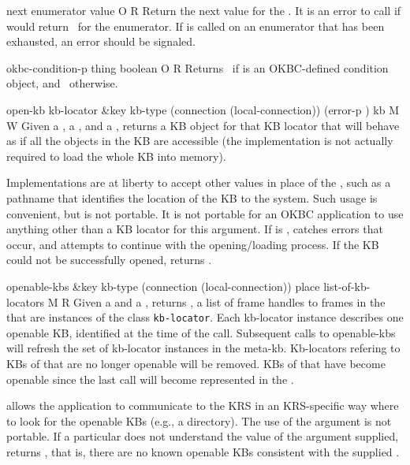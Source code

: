 \begin{okbcop}{next}{ enumerator} { value } { O } { R } {  }
Return the next value for the .  It is an error to
   call  if  would return \false\ for the
   enumerator.  If  is called on an enumerator that has been 
   exhausted, an  error should be signaled.
\end{okbcop}

\begin{okbcop}{okbc-condition-p}{ thing} { boolean } { O } { R } {  }
Returns \true\ if  is an OKBC-defined condition object, and
   \false\ otherwise.
\end{okbcop}

\begin{okbcop}{open-kb}{ kb-locator \&key kb-type (connection (local-connection)) (error-p \true)} { kb } { M } { W } {  }
Given a , a , and a
   , returns a KB object
   for that KB locator that will behave as if all the objects in the
   KB are accessible (the implementation is not actually required to load the
   whole KB into memory).

   Implementations are at liberty to accept other values in place of the
   , such as a pathname that identifies the location of
   the KB to the system.  Such usage is convenient, but is not portable.  It
   is not portable for an OKBC application to use anything other than
   a KB locator for this argument.  If  is \false, catches
   errors that occur, and attempts to continue with the opening/loading
   process.  If the KB could not be successfully opened, returns \false.
\end{okbcop}

\begin{okbcop}{openable-kbs}{ \&key kb-type (connection (local-connection)) place} { list-of-kb-locators } { M } { R } {  }
Given a  and a , returns
   , a list of frame handles to
   frames in the  that are instances of the class 
   {\tt kb-locator}.
   Each kb-locator instance describes one openable KB, identified at the
   time of the call.  Subsequent calls to openable-kbs will refresh the
   set of kb-locator instances in the meta-kb.  Kb-locators refering to
   KBs of  that are no longer openable will be removed.  KBs
   of  that have become openable since the last call will
   become represented in the .

    allows the application to communicate to the KRS in an
   KRS-specific way where to look for the openable KBs (e.g., a directory).
   The use of the  argument is not portable.
   If a particular  does not understand the value of
   the  argument supplied,  returns
   \emptylist, that is, there are no known openable KBs consistent
   with the supplied .
\end{okbcop}

